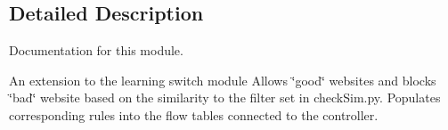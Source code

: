 \subsection{Detailed Description}
Documentation for this module. 

An extension to the learning switch module Allows \char`\"{}good\char`\"{} websites and blocks \char`\"{}bad\char`\"{} website based on the similarity to the filter set in check\+Sim.\+py. Populates corresponding rules into the flow tables connected to the controller. 